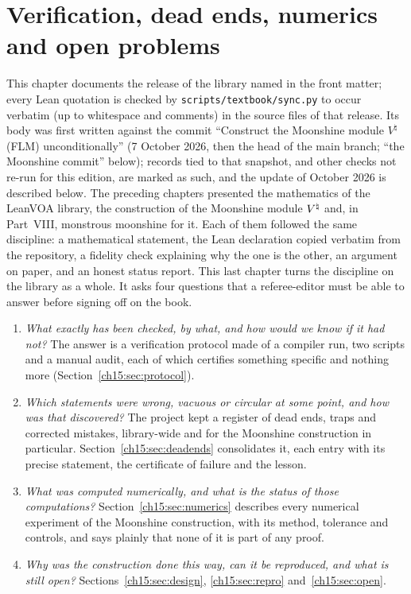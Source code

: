 \chapter{Verification, dead ends, numerics and open problems}\label{ch:15}

\providecommand{\chXVsq}{\mathbin{\ltimes}}

This chapter documents the release of the library named in the front matter; every Lean quotation is checked by \texttt{scripts/textbook/sync.py} to occur verbatim (up to whitespace and
comments) in the source files of that release. Its body was first written against the commit ``Construct the
Moonshine module $V^\natural$ (FLM) unconditionally'' (7 October 2026, then the head of the main branch; ``the Moonshine
commit'' below); records tied to that snapshot, and other checks not re-run for this edition, are marked as such, and the
update of October 2026 is described below. The
preceding chapters presented the mathematics of the LeanVOA library, the construction of the Moonshine module
${V^{\natural}}$ and, in Part~VIII, monstrous moonshine for it. Each of them followed the same
discipline: a mathematical statement, the Lean declaration copied verbatim from the repository, a
fidelity check explaining why the one is the other, an argument on paper, and an honest status
report. This last chapter turns the discipline on the library as a whole. It asks four questions
that a referee-editor must be able to answer before signing off on the book.

\begin{enumerate}[label=(\arabic*)]
\item \emph{What exactly has been checked, by what, and how would we know if it had not?} The
  answer is a verification protocol made of a compiler run, two scripts and a manual audit, each
  of which certifies something specific and nothing more (Section~\ref{ch15:sec:protocol}).
\item \emph{Which statements were wrong, vacuous or circular at some point, and how was that
  discovered?} The project kept a register of dead ends, traps and corrected mistakes, library-wide
  and for the Moonshine construction in particular. Section~\ref{ch15:sec:deadends} consolidates
  it, each entry with its precise statement, the certificate of failure and the lesson.
\item \emph{What was computed numerically, and what is the status of those computations?}
  Section~\ref{ch15:sec:numerics} describes every numerical experiment of the Moonshine
  construction, with its method, tolerance and controls, and says plainly that none of it is part
  of any proof.
\item \emph{Why was the construction done this way, can it be reproduced, and what is still
  open?} Sections~\ref{ch15:sec:design}, \ref{ch15:sec:repro} and~\ref{ch15:sec:open}.
\end{enumerate}

